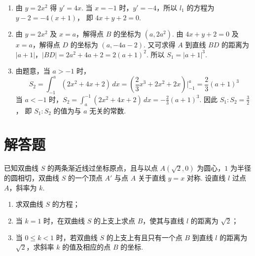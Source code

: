 \documentclass[UTF8,a4paper,oneside,11pt]{ctexbook}
\begin{document}
\begin{solution}
\begin{enumerate}
\item 由 \(y=2x^{2}\) 得 \(y'=4x\). 当 \(x=-1\) 时，\(y'=-4\)，所以 \(l_{1}\) 的方程为 \(y-2=-4(x+1)\)，
即 \(4x+y+2=0\).

\item 由 \(y=2x^{2}\) 及 \(x=a\)，解得点 \(B\) 的坐标为 \((a,2a^{2})\).
由 \(4x+y+2=0\) 及 \(x=a\)，解得点 \(D\) 的坐标为 \((a,-4a-2)\).
又可求得 \(A\) 到直线 \(BD\) 的距离为 \(|a+1|\)，\(|BD|=2a^{2}+4a+2=2(a+1)^{2}\). 所以 \(S_{1}=|a+1|^{3}\).

\item 由题意，当 \(a>-1\) 时，
\[
S_{2}=\int_{-1}^{a}(2x^{2}+4x+2)\,dx
=\left(\frac{2}{3}x^{3}+2x^{2}+2x\right)\Big|_{-1}^{a}
=\frac{2}{3}(a+1)^{3}
\]
当 \(a<-1\) 时，\(S_{2}=\int_{a}^{-1}(2x^{2}+4x+2)\,dx=-\frac{2}{3}(a+1)^{3}\).
因此 \(S_{1}:S_{2}=\frac{3}{2}\)，
即 \(S_{1}:S_{2}\) 的值为与 \(a\) 无关的常数.
\end{enumerate}
\end{solution}

\section{解答题}

\begin{problem}
已知双曲线 \(S\) 的两条渐近线过坐标原点，且与以点 \(A(\sqrt{2},0)\) 为圆心，\(1\) 为半径的圆相切，双曲线 \(S\) 的一个顶点 \(A'\) 与点 \(A\) 关于直线 \(y=x\) 对称. 设直线 \(l\) 过点 \(A\)，斜率为 \(k\).

\begin{enumerate}
\item 求双曲线 \(S\) 的方程；
\item 当 \(k=1\) 时，在双曲线 \(S\) 的上支上求点 \(B\)，使其与直线 \(l\) 的距离为 \(\sqrt{2}\)；
\item 当 \(0 \leqslant k < 1\) 时，若双曲线 \(S\) 的上支上有且只有一个点 \(B\) 到直线 \(l\) 的距离为 \(\sqrt{2}\)，求斜率 \(k\) 的值及相应的点 \(B\) 的坐标.
\end{enumerate}

\end{problem}
\end{document}
